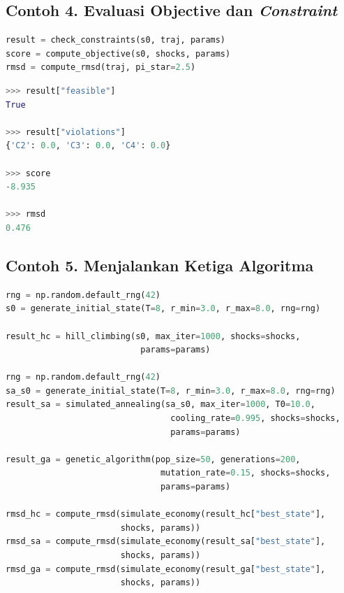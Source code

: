 \subsection*{Contoh 4. Evaluasi Objective dan \textit{Constraint}}

\begin{tcolorbox}[title=Input]
    \begin{lstlisting}[language=Python]
result = check_constraints(s0, traj, params)
score = compute_objective(s0, shocks, params)
rmsd = compute_rmsd(traj, pi_star=2.5)
\end{lstlisting}
\end{tcolorbox}

\begin{tcolorbox}[title=Output]
    \begin{lstlisting}[language=Python]
>>> result["feasible"]
True

>>> result["violations"]
{'C2': 0.0, 'C3': 0.0, 'C4': 0.0}

>>> score
-8.935

>>> rmsd
0.476
\end{lstlisting}
\end{tcolorbox}

\subsection*{Contoh 5. Menjalankan Ketiga Algoritma}

\begin{tcolorbox}[title=Input]
    \begin{lstlisting}[language=Python]
rng = np.random.default_rng(42)
s0 = generate_initial_state(T=8, r_min=3.0, r_max=8.0, rng=rng)

result_hc = hill_climbing(s0, max_iter=1000, shocks=shocks,
                           params=params)

rng = np.random.default_rng(42)
sa_s0 = generate_initial_state(T=8, r_min=3.0, r_max=8.0, rng=rng)
result_sa = simulated_annealing(sa_s0, max_iter=1000, T0=10.0,
                                 cooling_rate=0.995, shocks=shocks,
                                 params=params)

result_ga = genetic_algorithm(pop_size=50, generations=200,
                               mutation_rate=0.15, shocks=shocks,
                               params=params)

rmsd_hc = compute_rmsd(simulate_economy(result_hc["best_state"],
                       shocks, params))
rmsd_sa = compute_rmsd(simulate_economy(result_sa["best_state"],
                       shocks, params))
rmsd_ga = compute_rmsd(simulate_economy(result_ga["best_state"],
                       shocks, params))
\end{lstlisting}
\end{tcolorbox}

